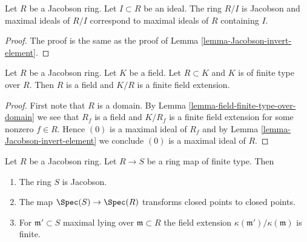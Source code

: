 \begin{lemma}
\label{lemma-Jacobson-mod-ideal}
Let $R$ be a Jacobson ring. Let $I \subset R$ be an ideal.
The ring $R/I$ is Jacobson and maximal ideals
of $R/I$ correspond to maximal ideals of $R$ containing $I$.
\end{lemma}

\begin{proof}
The proof is the same as the proof of
Lemma \ref{lemma-Jacobson-invert-element}.
\end{proof}

\begin{lemma}
\label{lemma-silly-jacobson}
Let $R$ be a Jacobson ring. Let $K$ be a field. Let $R \subset K$ and
$K$ is of finite type over $R$. Then $R$ is a field and $K/R$
is a finite field extension.
\end{lemma}

\begin{proof}
First note that $R$ is a domain.
By Lemma \ref{lemma-field-finite-type-over-domain}
we see that $R_f$ is a field and $K/R_f$ is a finite field extension
for some nonzero $f \in R$. Hence $(0)$ is a maximal ideal of $R_f$
and by
Lemma \ref{lemma-Jacobson-invert-element}
we conclude $(0)$ is a maximal ideal of $R$.
\end{proof}

\begin{proposition}
\label{proposition-Jacobson-permanence}
Let $R$ be a Jacobson ring. Let $R \to S$ be a
ring map of finite type. Then
\begin{enumerate}
\item The ring $S$ is Jacobson.
\item The map $\Spec(S) \to \Spec(R)$ transforms
closed points to closed points.
\item For $\mathfrak m' \subset S$ maximal lying over $\mathfrak m \subset R$
the field extension $\kappa(\mathfrak m')/\kappa(\mathfrak m)$
is finite.
\end{enumerate}
\end{proposition}


